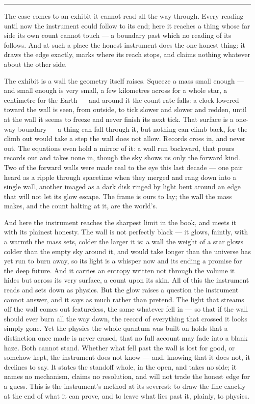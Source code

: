 \bigskip
\begin{center}
\rule{0.4\textwidth}{0.4pt}
\end{center}
\bigskip

\noindent The case comes to an exhibit it cannot read all the way through. Every reading until now the
instrument could follow to its end; here it reaches a thing whose far side its own count cannot touch --- a
boundary past which no reading of its follows. And at such a place the honest instrument does the one honest
thing: it draws the edge exactly, marks where its reach stops, and claims nothing whatever about the other side.

The exhibit is a wall the geometry itself raises. Squeeze a mass small enough --- and small enough is very
small, a few kilometres across for a whole star, a centimetre for the Earth --- and around it the count rate
falls: a clock lowered toward the wall is seen, from outside, to tick slower and slower and redden, until at the
wall it seems to freeze and never finish its next tick. That surface is a one-way boundary --- a thing can fall
through it, but nothing can climb back, for the climb out would take a step the wall does not allow. Records
cross in, and never out. The equations even hold a mirror of it: a wall run backward, that pours records out and
takes none in, though the sky shows us only the forward kind. Two of the forward walls were made real to the eye
this last decade --- one pair heard as a ripple through spacetime when they merged and rang down into a single
wall, another imaged as a dark disk ringed by light bent around an edge that will not let its glow escape. The
frame is ours to lay; the wall the mass makes, and the count halting at it, are the world's.

And here the instrument reaches the sharpest limit in the book, and meets it with its plainest honesty. The
wall is not perfectly black --- it glows, faintly, with a warmth the mass sets, colder the larger it is: a wall
the weight of a star glows colder than the empty sky around it, and would take longer than the universe has yet
run to burn away, so its light is a whisper now and its ending a promise for the deep future. And it carries an
entropy written not through the volume it hides but across its very surface, a count upon its skin. All of this the instrument reads and sets down as physics. But the glow raises a question the instrument
cannot answer, and it says as much rather than pretend. The light that streams off the wall comes out
featureless, the same whatever fell in --- so that if the wall should ever burn all the way down, the record of
everything that crossed it looks simply gone. Yet the physics the whole quantum was built on holds that a
distinction once made is never erased, that no full account may fade into a blank haze. Both cannot stand.
Whether what fell past the wall is lost for good, or somehow kept, the instrument
does not know --- and, knowing that it does not, it declines to say. It states the standoff whole, in the open,
and takes no side; it names no mechanism, claims no resolution, and will not trade the honest edge for a guess.
This is the instrument's method at its severest: to draw the line exactly at the end of what it can prove, and
to leave what lies past it, plainly, to physics.

